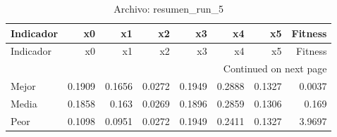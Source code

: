 \begin{longtable}{lrrrrrrr}
\caption{Archivo: resumen\_run\_5}\label{tab:resumen_run_5} \\
\toprule
Indicador & x0 & x1 & x2 & x3 & x4 & x5 & Fitness \\
\midrule
\endfirsthead
\toprule
Indicador & x0 & x1 & x2 & x3 & x4 & x5 & Fitness \\
\midrule
\endhead
\midrule
\multicolumn{8}{r}{Continued on next page} \\
\midrule
\endfoot
\bottomrule
\endlastfoot
Mejor & 0.1909 & 0.1656 & 0.0272 & 0.1949 & 0.2888 & 0.1327 & 0.0037 \\
Media & 0.1858 & 0.163 & 0.0269 & 0.1896 & 0.2859 & 0.1306 & 0.169 \\
Peor & 0.1098 & 0.0951 & 0.0272 & 0.1949 & 0.2411 & 0.1327 & 3.9697 \\
\end{longtable}